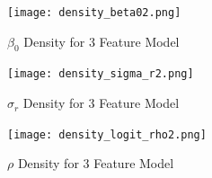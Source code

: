 \documentclass[11pt]{article}
\begin{document}
\begin{figure}[h!] 
	\centering
  \texttt{[image: density\_beta02.png]}
  \caption{$\beta_0$ Density for 3 Feature Model}
  \label{fig:dbeta02}
\end{figure}

\begin{figure}[h!] 
	\centering
  \texttt{[image: density\_sigma\_r2.png]}
  \caption{$\sigma_r$ Density for 3 Feature Model}
  \label{fig:dsigma_r2}
\end{figure}

\begin{figure}[h!] 
	\centering
  \texttt{[image: density\_logit\_rho2.png]}
  \caption{$\rho$ Density for 3 Feature Model}
  \label{fig:dlogit_rho2}
\end{figure}
\end{document}
